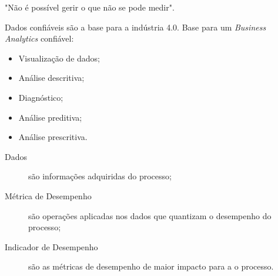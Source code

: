 
"Não é possível gerir o que não se pode medir".

Dados confiáveis são a base para a indústria 4.0. Base para um \emph{Business Analytics} confiável:
\begin{itemize}
    \item Visualização de dados; \\
    \item Análise descritiva; \\
    \item Diagnóstico; \\
    \item Análise preditiva; \\
    \item Análise prescritiva. \\
\end{itemize}

\begin{description}
    \item[Dados] são informações adquiridas do processo;
    \item[Métrica de Desempenho] são operações aplicadas nos dados que quantizam o desempenho do processo;
    \item[Indicador de Desempenho] são as métricas de desempenho de maior impacto para a o processo.
\end{description}

